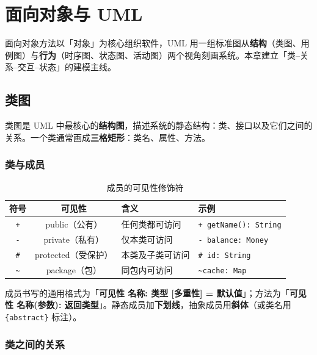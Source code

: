 \clearpage
\begingroup
\let\clearpage\relax
\let\cleardoublepage\relax
\vspace*{\fill}
\chapter{面向对象与 UML}
\begin{center}
面向对象方法以「对象」为核心组织软件，UML 用一组标准图从\textbf{结构}（类图、用例图）与\textbf{行为}（时序图、状态图、活动图）两个视角刻画系统。本章建立「类--关系--交互--状态」的建模主线。
\end{center}
\vspace*{\fill}
\endgroup
\clearpage

\section{类图}

类图是 UML 中最核心的\textbf{结构图}，描述系统的静态结构：类、接口以及它们之间的关系。一个类通常画成\textbf{三格矩形}：类名、属性、方法。

\subsection{类与成员}

\begin{table}[H]
\centering
\caption{成员的可见性修饰符}
\begin{tabulary}{\textwidth}{CCLL}
\toprule
符号 & 可见性 & 含义 & 示例 \\
\midrule
\texttt{+} & public（公有） & 任何类都可访问 & \texttt{+ getName(): String} \\
\texttt{-} & private（私有） & 仅本类可访问 & \texttt{- balance: Money} \\
\texttt{\#} & protected（受保护） & 本类及子类可访问 & \texttt{\# id: String} \\
\texttt{\textasciitilde} & package（包） & 同包内可访问 & \texttt{\textasciitilde cache: Map} \\
\bottomrule
\end{tabulary}
\end{table}

成员书写的通用格式为「\textbf{可见性 名称: 类型 [多重性] = 默认值}」；方法为「\textbf{可见性 名称(参数): 返回类型}」。静态成员加\textbf{下划线}，抽象成员用\textbf{斜体}（或类名用 \texttt{\{abstract\}} 标注）。

\subsection{类之间的关系}

